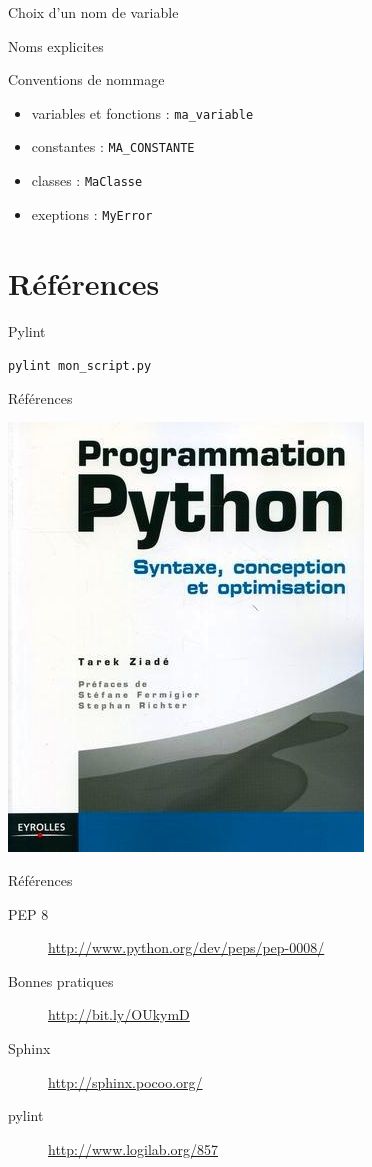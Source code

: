 \documentclass[xcolor=pdftex,dvipsnames,table,handout]{beamer}
\begin{document}
\begin{frame}{Choix d'un nom de variable}
\begin{center}
\Huge{Noms explicites}
\end{center}
\end{frame}

\begin{frame}{Conventions de nommage}
\begin{itemize}
    \item variables et fonctions : \texttt{ma\_variable}
    \item constantes : \texttt{MA\_CONSTANTE}
    \item classes : \texttt{MaClasse}
    \item exeptions : \texttt{MyError}
\end{itemize}
\end{frame}

\section{Références}

\begin{frame}{Pylint}
\begin{center}
\Large{\texttt{pylint mon\_script.py}}
\end{center}
\end{frame}

\begin{frame}{Références}
\begin{center}
\includegraphics[width=0.5\linewidth]{img/pp}
\end{center}
\end{frame}

\begin{frame}{Références}
\begin{description}
    \item[PEP 8] \url{http://www.python.org/dev/peps/pep-0008/}
    \item[Bonnes pratiques] \url{http://bit.ly/OUkymD}
    \item[Sphinx] \url{http://sphinx.pocoo.org/}
    \item[pylint] \url{http://www.logilab.org/857}
\end{description}
\end{frame}
\end{document}
